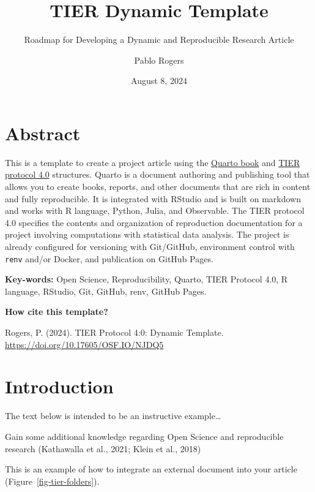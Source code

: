 \documentclass[
  a4paper,
]{article}
\title{TIER Dynamic Template}
\subtitle{Roadmap for Developing a Dynamic and Reproducible Research
Article}
\author{Pablo Rogers}
\date{August 8, 2024}
\begin{document}
\maketitle


\section*{Abstract}\label{abstract}


This is a template to create a project article using the
\href{https://quarto.org/docs/books/}{Quarto book} and
\href{https://www.projecttier.org/tier-protocol/protocol-4-0/}{TIER
protocol 4.0} structures. Quarto is a document authoring and publishing
tool that allows you to create books, reports, and other documents that
are rich in content and fully reproducible. It is integrated with
RStudio and is built on markdown and works with R language, Python,
Julia, and Observable. The TIER protocol 4.0 specifies the contents and
organization of reproduction documentation for a project involving
computations with statistical data analysis. The project is already
configured for versioning with Git/GitHub, environment control with
\texttt{renv} and/or Docker, and publication on GitHub Pages.

\textbf{Key-words:} Open Science, Reproducibility, Quarto, TIER Protocol
4.0, R language, RStudio, Git, GitHub, renv, GitHub Pages.

\textbf{How cite this template?}

Rogers, P. (2024). TIER Protocol 4:0: Dynamic Template.
\url{https://doi.org/10.17605/OSF.IO/NJDQ5}


\section{Introduction}\label{introduction}

The text below is intended to be an instructive example\ldots{}

Gain some additional knowledge regarding Open Science and reproducible
research (Kathawalla et al., 2021; Klein et al., 2018)

This is an example of how to integrate an external document into your
article (Figure~\ref{fig-tier-folders}).
\end{document}
